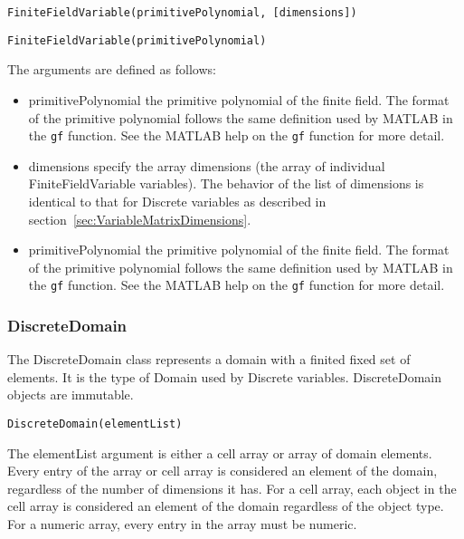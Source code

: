 \ifmatlab
\begin{lstlisting}
FiniteFieldVariable(primitivePolynomial, [dimensions])
\end{lstlisting}
\fi

\ifjava
\begin{lstlisting}
FiniteFieldVariable(primitivePolynomial)
\end{lstlisting}
\fi

The arguments are defined as follows:

\ifmatlab
\begin{itemize}
\item primitivePolynomial the primitive polynomial of the finite field.  The format of the primitive polynomial follows the same definition used by MATLAB in the \texttt{gf} function.  See the MATLAB help on the \texttt{gf} function for more detail.
\item dimensions specify the array dimensions (the array of individual FiniteFieldVariable variables).  The behavior of the list of dimensions is identical to that for Discrete variables as described in section~\ref{sec:VariableMatrixDimensions}.
\end{itemize}
\fi

\ifjava
\begin{itemize}
\item primitivePolynomial the primitive polynomial of the finite field.  The format of the primitive polynomial follows the same definition used by MATLAB in the \texttt{gf} function.  See the MATLAB help on the \texttt{gf} function for more detail.
\end{itemize}
\fi

\subsubsection{DiscreteDomain}
\label{sec:DiscreteDomain}

The DiscreteDomain class represents a domain with a finited fixed set of elements. It is the type of Domain used
by Discrete variables. DiscreteDomain objects are immutable.


\begin{lstlisting}
DiscreteDomain(elementList)
\end{lstlisting}

\ifmatlab
The elementList argument is either a cell array or array of domain elements.  Every entry of the array or cell array is considered an element of the domain, regardless of the number of dimensions it has.  For a cell array, each object in the cell array is considered an element of the domain regardless of the object type.  For a numeric array, every entry in the array must be numeric.
\fi

